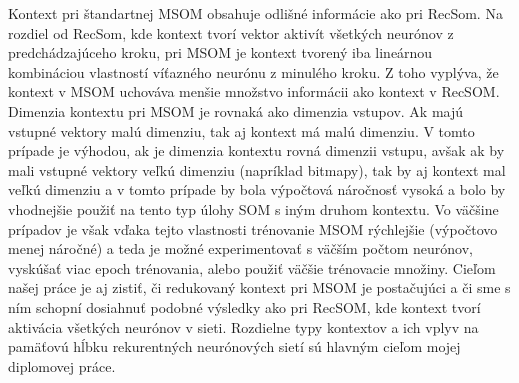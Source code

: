 Kontext pri štandartnej MSOM obsahuje odlišné informácie ako pri RecSom.
Na rozdiel od RecSom, kde kontext tvorí vektor aktivít všetkých neurónov z predchádzajúceho kroku, pri
MSOM je kontext tvorený iba lineárnou kombináciou vlastností víťazného neurónu z minulého kroku. Z toho vyplýva, že
kontext v MSOM uchováva menšie množstvo informácii ako kontext v RecSOM.
Dimenzia kontextu pri MSOM je rovnaká ako dimenzia vstupov. Ak majú vstupné vektory malú dimenziu,
tak aj kontext má malú dimenziu. V tomto prípade je výhodou, ak je dimenzia kontextu rovná dimenzii vstupu, avšak
ak by mali vstupné vektory veľkú dimenziu (napríklad bitmapy), tak by aj kontext mal veľkú dimenziu a v tomto prípade by bola
výpočtová náročnosť vysoká a bolo by vhodnejšie použiť na tento typ úlohy SOM s iným druhom kontextu.
Vo väčšine prípadov je však vďaka tejto vlastnosti trénovanie MSOM rýchlejšie (výpočtovo menej náročné) a teda je možné experimentovať 
s väčším počtom neurónov, vyskúšať viac epoch trénovania, alebo použiť väčšie trénovacie množiny.
Cieľom našej práce je aj zistiť, či redukovaný kontext pri MSOM je postačujúci a či sme s ním 
schopní dosiahnuť podobné výsledky ako pri RecSOM, kde kontext tvorí aktivácia všetkých neurónov v sieti.
Rozdielne typy kontextov a ich vplyv na pamäťovú hĺbku rekurentných 
neurónových sietí sú hlavným cieľom mojej diplomovej práce.





